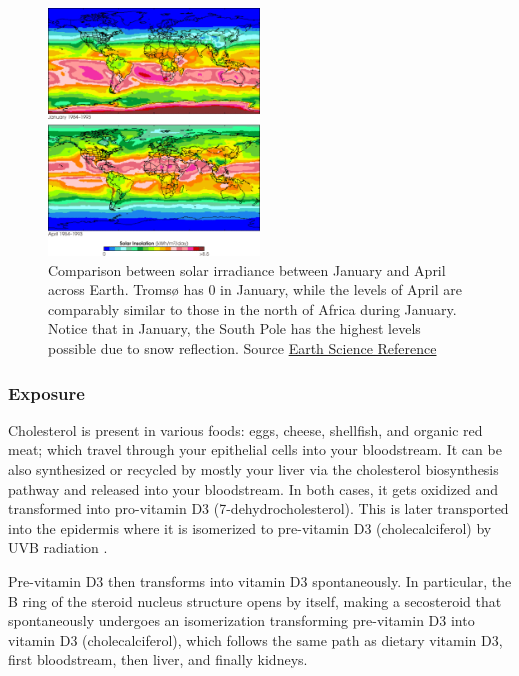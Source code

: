 \begin{figure}[h!]

    \centering
    \includegraphics[width=0.5\textwidth]{figures/Vitamin D/512px-Insolation_gif.png}
    \caption{Comparison between solar irradiance between January and April across Earth. Tromsø has 0 in January, while the levels of April are comparably similar to those in the north of Africa during January. Notice that in January, the South Pole has the highest levels possible due to snow reflection. Source \href{http://mcsmearthscience.blogspot.com/2013/02/}{Earth Science Reference}}
    \label{fig:sunirradianceJA}

\end{figure}
 
\subsubsection{Exposure}
\label{vitDExposure}

Cholesterol is present in various foods: eggs, cheese, shellfish, and organic red meat; which travel through your epithelial cells into your bloodstream. It can be also synthesized or recycled by mostly your liver via the cholesterol biosynthesis pathway and released into your bloodstream. In both cases, it gets oxidized and transformed into pro-vitamin D3 (7-dehydrocholesterol). This is later transported into the epidermis where it is isomerized to pre-vitamin D3 (cholecalciferol) by UVB radiation \cite{ref:Norman1998}.

Pre-vitamin D3 then transforms into vitamin D3 spontaneously. In particular, the B ring of the steroid nucleus structure opens by itself, making a secosteroid that spontaneously undergoes an isomerization transforming pre-vitamin D3 into vitamin D3 (cholecalciferol), which follows the same path as dietary vitamin D3, first bloodstream, then liver, and finally kidneys. \vspace{3 mm}

